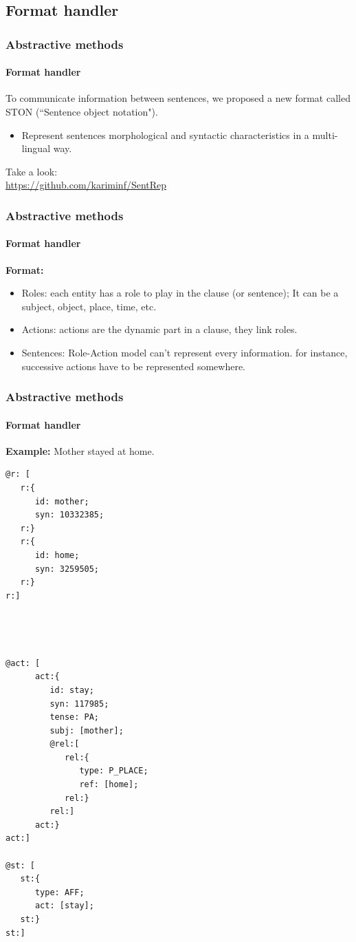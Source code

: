 \documentclass{beamer}
\begin{document}
\subsection{Format handler}
\begin{frame}
\frametitle{Abstractive methods}
\framesubtitle{Format handler}

To communicate information between sentences, we proposed a new format called STON (``Sentence object notation").

\begin{itemize}
\item Represent sentences morphological and syntactic characteristics in a multi-lingual way.
\end{itemize}

Take a look:\\
\url{https://github.com/kariminf/SentRep}


\end{frame}

\begin{frame}
\frametitle{Abstractive methods}
\framesubtitle{Format handler}

{\LARGE \textbf{Format:}}\\

\begin{itemize}
\item Roles: each entity has a role to play in the clause (or sentence); It can be a subject, object, place, time, etc.
\item Actions: actions are the dynamic part in a clause, they link roles.
\item Sentences: Role-Action model can't represent every information. 
for instance, successive actions have to be represented somewhere.
\end{itemize}

\end{frame}

\begin{frame}[fragile]
\frametitle{Abstractive methods}
\framesubtitle{Format handler}

{\LARGE \textbf{Example:}}
Mother stayed at home.\\
\begin{multicols}{3}
\scriptsize\bf
\begin{verbatim}
@r: [
   r:{
      id: mother;
      syn: 10332385;
   r:}
   r:{
      id: home;
      syn: 3259505;
   r:}
r:]




@act: [
      act:{
         id: stay;
         syn: 117985;
         tense: PA;
         subj: [mother];
         @rel:[
            rel:{
               type: P_PLACE;
               ref: [home];
            rel:}
         rel:]
      act:}
act:]

@st: [
   st:{
      type: AFF;
      act: [stay];
   st:}
st:]







\end{verbatim}
\end{multicols}

\end{frame}
\end{document}
